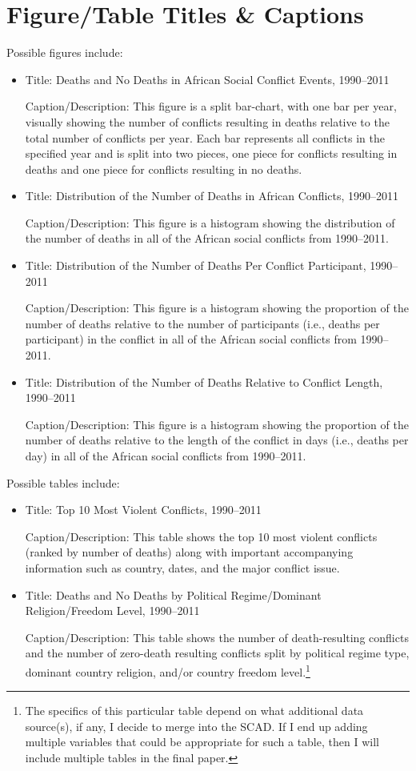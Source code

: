 \documentclass{article}
\begin{document}
\section{Figure/Table Titles \& Captions}
Possible figures include:
\begin{itemize}
\item Title: Deaths and No Deaths in African Social Conflict Events, 1990--2011

Caption/Description: This figure is a split bar-chart, with one bar per year, visually showing the number of conflicts resulting in deaths relative to the total number of conflicts per year. Each bar represents all conflicts in the specified year and is split into two pieces, one piece for conflicts resulting in deaths and one piece for conflicts resulting in no deaths.
\item Title: Distribution of the Number of Deaths in African Conflicts, 1990--2011

Caption/Description: This figure is a histogram showing the distribution of the number of deaths in all of the African social conflicts from 1990--2011.
\item Title: Distribution of the Number of Deaths Per Conflict Participant, 1990--2011

Caption/Description: This figure is a histogram showing the proportion of the number of deaths relative to the number of participants (i.e., deaths per participant) in the conflict in all of the African social conflicts from 1990--2011.

\item Title: Distribution of the Number of Deaths Relative to Conflict Length, 1990--2011

Caption/Description: This figure is a histogram showing the proportion of the number of deaths relative to the length of the conflict in days (i.e., deaths per day) in all of the African social conflicts from 1990--2011.
\end{itemize}
Possible tables include:
\begin{itemize}
\item Title: Top 10 Most Violent Conflicts, 1990--2011

Caption/Description: This table shows the top 10 most violent conflicts (ranked by number of deaths) along with important accompanying information such as country, dates, and the major conflict issue.

\item Title: Deaths and No Deaths by Political Regime/Dominant Religion/Freedom Level, 1990--2011

Caption/Description: This table shows the number of death-resulting conflicts and the number of zero-death resulting conflicts split by political regime type, dominant country religion, and/or country freedom level.\footnote{The specifics of this particular table depend on what additional data source(s), if any, I decide to merge into the SCAD.  If I end up adding multiple variables that could be appropriate for such a table, then I will include multiple tables in the final paper.}
\end{itemize}
\end{document}
